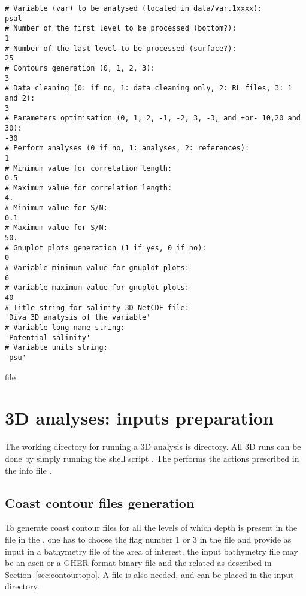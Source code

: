 \begin{exfile}[H] %
\begin{footnotesize}
\begin{verbatim}
# Variable (var) to be analysed (located in data/var.1xxxx):
psal
# Number of the first level to be processed (bottom?):
1
# Number of the last level to be processed (surface?):
25
# Contours generation (0, 1, 2, 3):
3
# Data cleaning (0: if no, 1: data cleaning only, 2: RL files, 3: 1 and 2):
3
# Parameters optimisation (0, 1, 2, -1, -2, 3, -3, and +or- 10,20 and 30):
-30
# Perform analyses (0 if no, 1: analyses, 2: references):
1
# Minimum value for correlation length:
0.5
# Maximum value for correlation length:
4.
# Minimum value for S/N:
0.1
# Maximum value for S/N:
50.
# Gnuplot plots generation (1 if yes, 0 if no):
0
# Variable minimum value for gnuplot plots:
6
# Variable maximum value for gnuplot plots:
40
# Title string for salinity 3D NetCDF file:
'Diva 3D analysis of the variable'
# Variable long name string:
'Potential salinity'
# Variable units string:
'psu'
\end{verbatim}
\end{footnotesize}
\caption{ file}
\label{3Dinfotfile}
\end{exfile}

\section{3D analyses: inputs preparation \label{3Dpreproc}}

The working directory for running a 3D \diva analysis is  directory. All \diva 3D runs can be done by simply running the shell script . The  performs the actions prescribed in the info file .


\subsection{Coast contour files generation \label{contgeneration}}

To generate coast contour files for all the levels of which depth is present in the  file in the , one has to choose the flag number $1$ or $3$ in the  file and provide as input in  a bathymetry file of the area of interest. the input bathymetry file may be an ascii  or a GHER format binary file  and the related  as described in Section~\ref{sec:contourtopo}. A  file is also needed, and can be placed in the  input directory.

